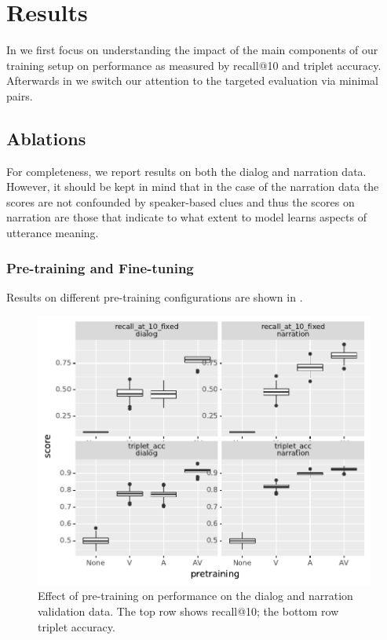 \section{Results}
\label{sec:results}
In  we first focus on understanding the impact of
the main components of our training setup on performance as measured
by recall@10 and triplet accuracy. Afterwards in
 we switch our attention to the targeted
evaluation via minimal pairs.


\subsection{Ablations}
\label{sec:ablations}
For completeness, we report results on both the dialog and narration
data. However, it should be kept in mind that in the case of the
narration data the scores are not confounded by speaker-based clues
and thus the scores on narration are those that indicate to what extent to
model learns aspects of utterance meaning.

\subsubsection{Pre-training and Fine-tuning}
Results on different pre-training configurations are shown in
.
\begin{figure}[htb]
	\centering
	\includegraphics[width=\columnwidth]{results/ablations/pretraining.pdf}
	\caption{Effect of pre-training on performance on the dialog
          and narration validation data. The top row shows recall@10;
          the bottom row triplet accuracy.}
	\label{fig:pretraining}
      \end{figure}

